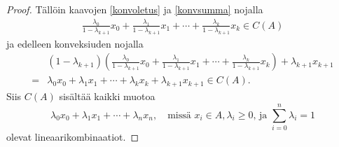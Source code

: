 \documentclass[12pt,a4paper,leqno]{report}
\theoremstyle{plain}
\theoremstyle{definition}
\theoremstyle{remark}
\begin{document}
\begin{proof}
Tällöin kaavojen \ref{konvoletus} ja \ref{konvsumma} nojalla
\begin{equation*}
\begin{split}
\frac{ \lambda_0}{1-\lambda_{k+1}} x_0+\frac{ \lambda_1}{1-\lambda_{k+1}} x_1+\cdots+\frac{ \lambda_k}{1-\lambda_{k+1}} x_{k}\in C(A)
\end{split}
\end{equation*}
ja edelleen konveksiuden nojalla
\begin{equation*}
\begin{split}
&(1-\lambda_{k+1})\left(\frac{ \lambda_0}{1-\lambda_{k+1}} x_0+\frac{ \lambda_1}{1-\lambda_{k+1}} x_1+\cdots+\frac{ \lambda_k}{1-\lambda_{k+1}} x_{k}\right) +\lambda_{k+1} x_{k+1}\\
=&\lambda_0 x_0+\lambda_1 x_1+\cdots+\lambda_{k} x_{k}+\lambda_{k+1} x_{k+1}\in C(A).
\end{split}
\end{equation*}
%
%
%
%
Siis $C(A)$ sisältää kaikki muotoa%
\begin{equation*}
\lambda_0 x_0+\lambda_1 x_1+\cdots+\lambda_{n} x_{n},
\quad\text{missä } x_i\in A, \lambda_i\geq0\text{, ja }
\sum_{i=0}^{n}{\lambda_i}=1
\end{equation*} 
olevat lineaarikombinaatiot.
%
%
%


\end{proof}
\end{document}
